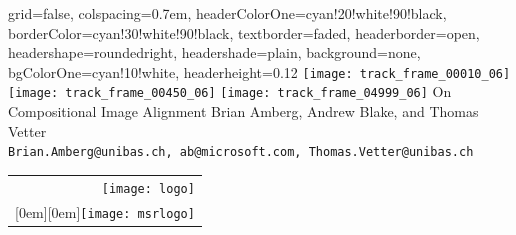 \documentclass[landscape,a0paper,fontscale=0.292]{baposter}
\begin{document}
\begin{poster}{
    grid=false,
    colspacing=0.7em,
    headerColorOne=cyan!20!white!90!black,
    borderColor=cyan!30!white!90!black,
    textborder=faded,
    headerborder=open,
    headershape=roundedright,
    headershade=plain,
    background=none,
    bgColorOne=cyan!10!white,
    headerheight=0.12\textheight
}
 {
      \texttt{[image: track\_frame\_00010\_06]}
      \texttt{[image: track\_frame\_00450\_06]}
      \texttt{[image: track\_frame\_04999\_06]}
 }
 {\sc\Huge On Compositional Image Alignment}
 {Brian Amberg, Andrew Blake, and Thomas Vetter\\[1em]
 {\texttt{Brian.Amberg@unibas.ch, ab@microsoft.com, Thomas.Vetter@unibas.ch}}}
 {
  \begin{tabular}{r}
    \texttt{[image: logo]}\\
    \raisebox{0em}[0em][0em]{\texttt{[image: msrlogo]}}
  \end{tabular}
 }



\end{poster}
\end{document}
